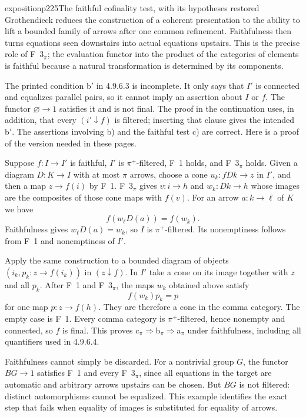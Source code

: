 \begin{dcomment}{exposition}{p225}{The faithful cofinality test, with its hypotheses restored}
Grothendieck reduces the construction of a coherent presentation to the ability to lift a bounded family of arrows after one common refinement. Faithfulness then turns equations seen downstairs into actual equations upstairs. This is the precise role of F~$3_\pi$; the evaluation functor into the product of the categories of elements is faithful because a natural transformation is determined by its components.

The printed condition b$'$ in 4.9.6.3 is incomplete. It only says that $I'$ is connected and equalizes parallel pairs, so it cannot imply an assertion about $I$ or $f$. The functor $\varnothing\to1$ satisfies it and is not final. The proof in the continuation uses, in addition, that every $(i'\downarrow f)$ is filtered; inserting that clause gives the intended b$'$. The assertions involving b) and the faithful test c) are correct. Here is a proof of the version needed in these pages.

Suppose $f:I\to I'$ is faithful, $I'$ is $\pi^+$-filtered, F~1 holds, and F~$3_\pi$ holds. Given a diagram $D:K\to I$ with at most $\pi$ arrows, choose a cone $u_k:fDk\to z$ in $I'$, and then a map $z\to f(i)$ by F~1. F~$3_\pi$ gives $v:i\to h$ and $w_k:Dk\to h$ whose images are the composites of those cone maps with $f(v)$. For an arrow $a:k\to\ell$ of $K$ we have
\[
 f(w_\ell D(a))=f(w_k).
\]
Faithfulness gives $w_\ell D(a)=w_k$, so $I$ is $\pi^+$-filtered. Its nonemptiness follows from F~1 and nonemptiness of $I'$.

Apply the same construction to a bounded diagram of objects $(i_k,p_k:z\to f(i_k))$ in $(z\downarrow f)$. In $I'$ take a cone on its image together with $z$ and all $p_k$. After F~1 and F~$3_\pi$, the maps $w_k$ obtained above satisfy
\[
 f(w_k)p_k=p
\]
for one map $p:z\to f(h)$. They are therefore a cone in the comma category. The empty case is F~1. Every comma category is $\pi^+$-filtered, hence nonempty and connected, so $f$ is final. This proves c$_\pi\Rightarrow$b$_\pi\Rightarrow$a$_\pi$ under faithfulness, including all quantifiers used in 4.9.6.4.

Faithfulness cannot simply be discarded. For a nontrivial group $G$, the functor $BG\to1$ satisfies F~1 and every F~$3_\pi$, since all equations in the target are automatic and arbitrary arrows upstairs can be chosen. But $BG$ is not filtered: distinct automorphisms cannot be equalized. This example identifies the exact step that fails when equality of images is substituted for equality of arrows.
\end{dcomment}

